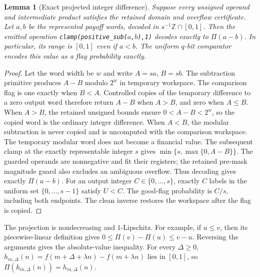 \documentclass[11pt]{article}
\newtheorem{lemma}[theorem]{Lemma}
\begin{document}
\begin{lemma}[Exact projected integer difference]
\label{lem:raw-asymmetric-projection}
Suppose every unsigned operand and intermediate product satisfies the
retained domain and overflow certificate. Let $a,b$ be the represented
payoff words, decoded in $s^{-1}\mathbb Z\cap[0,1]$. Then the emitted
operation \texttt{clamp(positive\_sub($a$,$b$),1)} decodes exactly to
$\Pi(a-b)$. In particular, its range is $[0,1]$ even if $a<b$.
The uniform $q$-bit comparator encodes this value as a flag probability
exactly.
\end{lemma}
\begin{proof}
Let the word width be $w$ and write $A=sa$, $B=sb$. The subtraction
primitive produces $A-B$ modulo $2^w$ in temporary workspace. The
comparison flag is one exactly when $B<A$. Controlled copies of the
temporary difference to a zero output word therefore return $A-B$ when
$A>B$, and zero when $A\leq B$. When $A>B$, the retained unsigned
bounds ensure $0<A-B<2^w$, so the copied word is the ordinary integer
difference. When $A<B$, the modular subtraction is never copied and is
uncomputed with the comparison workspace. The temporary modular word
does not become a financial value. The subsequent clamp at the exactly
representable integer $s$ gives $\min\{s,\max\{0,A-B\}\}$.
The guarded operands are nonnegative and fit their registers; the
retained pre-mask magnitude guard also excludes an ambiguous overflow.
Thus decoding gives exactly $\Pi(a-b)$. For an output integer
$C\in\{0,\ldots,s\}$, exactly $C$ labels in the uniform set
$\{0,\ldots,s-1\}$ satisfy $U<C$. The good-flag probability is
$C/s$, including both endpoints. The clean inverse restores the
workspace after the flag is copied.
\end{proof}

The projection is nondecreasing and $1$-Lipschitz. For example, if
$u\leq v$, then its piecewise-linear definition gives
$0\leq\Pi(v)-\Pi(u)\leq v-u$. Reversing the arguments gives the
absolute-value inequality. For every $\Delta\geq0$,
$h_{m,\Delta}(n)=f(m+\Delta+\lambda n)-f(m+\lambda n)$ lies in
$[0,1]$, so $\Pi(h_{m,\Delta}(n))=h_{m,\Delta}(n)$.
\end{document}
